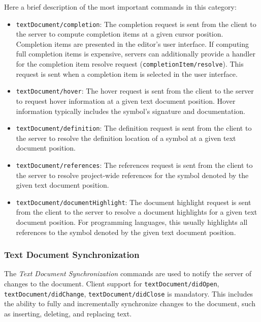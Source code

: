 Here a brief description of the most important commands in this category:
\begin{itemize}
    \item \texttt{textDocument/completion}: The completion request is sent from the client to the server to compute completion items at a given cursor position. Completion items are presented in the editor's user interface. If computing full completion items is expensive, servers can additionally provide a handler for the completion item resolve request (\texttt{completionItem/resolve}). This request is sent when a completion item is selected in the user interface.
    \item \texttt{textDocument/hover}: The hover request is sent from the client to the server to request hover information at a given text document position. Hover information typically includes the symbol's signature and documentation.
    \item \texttt{textDocument/definition}: The definition request is sent from the client to the server to resolve the definition location of a symbol at a given text document position.
    \item \texttt{textDocument/references}: The references request is sent from the client to the server to resolve project-wide references for the symbol denoted by the given text document position.
    \item \texttt{textDocument/documentHighlight}: The document highlight request is sent from the client to the server to resolve a document highlights for a given text document position. For programming languages, this usually highlights all references to the symbol denoted by the given text document position.
\end{itemize}

\subsubsection{Text Document Synchronization}\label{subsec:background:TextDocumentSynchronization}
The \textit{Text Document Synchronization} commands are used to notify the server of changes to the document. Client support for \texttt{textDocument/didOpen}, \texttt{textDocument/didChange}, \texttt{textDocument/didClose} is mandatory. This includes the ability to fully and incrementally synchronize changes to the document, such as inserting, deleting, and replacing text.


